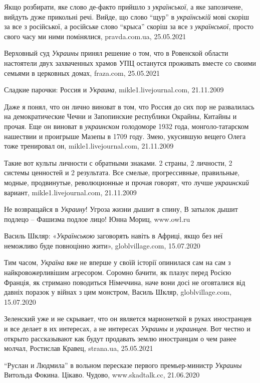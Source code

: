Якщо розбирати, яке слово де-факто прийшло з \emph{української}, а яке
запозичене, вийдуть дуже прикольні речі. Вийде, що слово \enquote{щур} в
\emph{українській} мові скоріш за все з російської, а російське слово
\enquote{крыса} скоріш за все з \emph{української}, просто свого часу ми ними
помінялися, pravda.com.ua, 25.05.2021

Верховный суд \emph{Украины} принял решение о том, что в Ровенской области настоятели
двух захваченных храмов УПЦ останутся проживать вместе со своими семьями в
церковных домах, fraza.com, 25.05.2021

Сладкие парочки: Россия и \emph{Украина}, mikle1.livejournal.com, 21.11.2009

Даже я понял, что он лично виноват в том, что Россия до сих пор не развалилась
на демократические Чечни и Запопинские республики Окрайны, Китайны и прочая.
Еще он виноват в \emph{украинском} голодоморе 1932 года, монголо-татарском
нашествии и проигрыше Мазепы в 1709 году. Змею, укусившую вещего Олега тоже
тренировал он, mikle1.livejournal.com, 21.11.2009

Такие вот культы личности с обратными знаками. 2 страны, 2 личности, 2 системы
ценностей и 2 результата. Все смелые, прогрессивные, правильные, модные,
продвинутые, революционные и прочая говорят, что лучше \emph{украинский}
вариант, mikle1.livejournal.com, 21.11.2009

Не возвращайся в \emph{Украину}!  Угроза жизни дышит в спину, В затылок дышит
подлецо – Фашизма подлое лицо! Юнна Мориц, www.owl.ru

Василь Шкляр: «\emph{Українською} заговорять навіть в Африці, якщо без неї неможливо
буде повноцінно жити», globlvillage.com, 15.07.2020

Тим часом, \emph{Україна} вже не вперше у своїй історії опинилася сам на сам з
найкровожерливішим агресором. Соромно бачити, як плазує перед Росією Франція,
як стримано поводиться Німеччина, наче вони досі не оговталися від давніх
поразок у війнах з цим монстром, Василь Шкляр, globlvillage.com, 15.07.2020

Зеленский уже и не скрывает, что он является марионеткой в руках иностранцев и
все делает в их интересах, а не интересах \emph{Украины} и \emph{украинцев}.
Вот честно и открыто рассказывают как будут продавать землю иностранцам о чем
ранее молчал, Ростислав Кравец, strana.ua, 25.05.2021

\enquote{Руслан и Людмила} в вольном пересказе первого премьер-министр
\emph{Украины} Витольда Фокина. Цікаво. Чудово, www.skadtalk.cc, 21.06.2020

